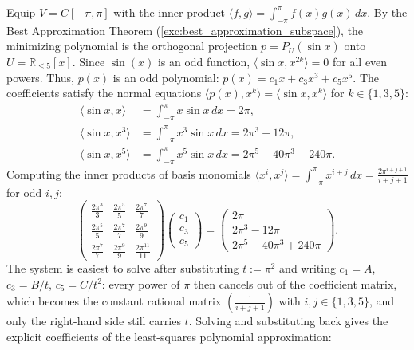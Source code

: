 \begin{exercisesolution*}
\label{sol:least_squares_polynomial_sine}
Equip $V = C[-\pi, \pi]$ with the inner product $\langle f, g \rangle = \int_{-\pi}^\pi f(x) g(x) \, dx$.
By the Best Approximation Theorem (\cref{exc:best_approximation_subspace}), the minimizing polynomial is the orthogonal projection $p = P_U(\sin x)$ onto $U = \mathbb{R}_{\le 5}[x]$.
Since $\sin(x)$ is an odd function, $\langle \sin x, x^{2k} \rangle = 0$ for all even powers.
Thus, $p(x)$ is an odd polynomial: $p(x) = c_1 x + c_3 x^3 + c_5 x^5$.
The coefficients satisfy the normal equations $\langle p(x), x^k \rangle = \langle \sin x, x^k \rangle$ for $k \in \{1, 3, 5\}$:
\begin{align*}
\langle \sin x, x \rangle &= \int_{-\pi}^\pi x \sin x \, dx = 2\pi, \\
\langle \sin x, x^3 \rangle &= \int_{-\pi}^\pi x^3 \sin x \, dx = 2\pi^3 - 12\pi, \\
\langle \sin x, x^5 \rangle &= \int_{-\pi}^\pi x^5 \sin x \, dx = 2\pi^5 - 40\pi^3 + 240\pi.
\end{align*}
Computing the inner products of basis monomials $\langle x^i, x^j \rangle = \int_{-\pi}^\pi x^{i+j} \, dx = \frac{2\pi^{i+j+1}}{i+j+1}$ for odd $i, j$:
\[
\begin{pmatrix}
  \frac{2\pi^3}{3} & \frac{2\pi^5}{5} & \frac{2\pi^7}{7} \\
  \frac{2\pi^5}{5} & \frac{2\pi^7}{7} & \frac{2\pi^9}{9} \\
  \frac{2\pi^7}{7} & \frac{2\pi^9}{9} & \frac{2\pi^{11}}{11}
\end{pmatrix}
\begin{pmatrix} c_1 \\ c_3 \\ c_5 \end{pmatrix}
=
\begin{pmatrix}
  2\pi \\
  2\pi^3 - 12\pi \\
  2\pi^5 - 40\pi^3 + 240\pi
\end{pmatrix}.
\]
The system is easiest to solve after substituting $t := \pi^2$ and writing $c_1 = A$, $c_3 = B/t$, $c_5 = C/t^2$: every power of $\pi$ then cancels out of the coefficient matrix, which becomes the constant rational matrix $\left(\tfrac{1}{i+j+1}\right)$ with $i, j \in \{1,3,5\}$, and only the right-hand side still carries $t$. Solving and substituting back gives the explicit coefficients of the least-squares polynomial approximation:

\end{exercisesolution*}
